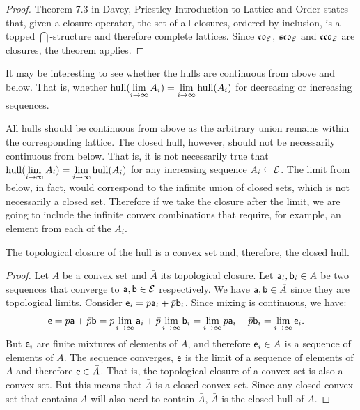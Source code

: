 \begin{mathSection}
\begin{proof}
	Theorem 7.3 in Davey, Priestley Introduction to Lattice and Order states that, given a closure operator, the set of all closures, ordered by inclusion, is a topped $\bigcap$-structure and therefore complete lattices. Since $\mathfrak{co}_{\Ens}$, $\mathfrak{sco}_{\Ens}$ and $\mathfrak{cco}_{\Ens}$ are closures, the theorem applies.
\end{proof}

\begin{remark}
It may be interesting to see whether the hulls are continuous from above and below. That is, whether  $\hull(\lim\limits_{i \to \infty} A_i) = \lim\limits_{i \to \infty} \hull(A_i)$ for decreasing or increasing sequences.

All hulls should be continuous from above as the arbitrary union remains within the corresponding lattice. The closed hull, however, should not be necessarily continuous from below. That is, it is not necessarily true that $\hull(\lim\limits_{i \to \infty} A_i) = \lim\limits_{i \to \infty} \hull(A_i)$ for any increasing sequence $A_i \subseteq \Ens$. The limit from below, in fact, would correspond to the infinite union of closed sets, which is not necessarily a closed set. Therefore if we take the closure after the limit, we are going to include the infinite convex combinations that require, for example, an element from each of the $A_i$.
\end{remark}


\begin{prop}
	The topological closure of the hull is a convex set and, therefore, the closed hull.
\end{prop}

\begin{proof}
	Let $A$ be a convex set and $\bar{A}$ its topological closure. Let $\ens[a]_i, \ens[b]_i \in A$ be two sequences that converge to $\ens[a], \ens[b] \in \Ens$ respectively. We have $\ens[a], \ens[b] \in \bar{A}$ since they are topological limits. Consider $\ens_i = p \ens[a]_i + \bar{p} \ens[b]_i$. Since mixing is continuous, we have:
	\begin{equation}
		\begin{aligned}
			\ens &= p \ens[a] + \bar{p} \ens[b] = p \lim\limits_{i \to \infty} \ens[a]_i + \bar{p} \lim\limits_{i \to \infty} \ens[b]_i = \lim\limits_{i \to \infty} p \ens[a]_i + \bar{p} \ens[b]_i = \lim\limits_{i \to \infty} \ens_i.
		\end{aligned}
	\end{equation}
	But $\ens_i$ are finite mixtures of elements of $A$, and therefore $\ens_i \in A$ is a sequence of elements of $A$. The sequence converges, $\ens$ is the limit of a sequence of elements of $A$ and therefore $\ens \in \bar{A}$. That is, the topological closure of a convex set is also a convex set. But this means that $\bar{A}$ is a closed convex set. Since any closed convex set that contains $A$ will also need to contain $\bar{A}$, $\bar{A}$ is the closed hull of $A$.


\end{proof}
\end{mathSection}
